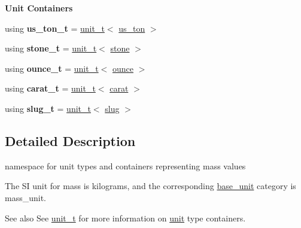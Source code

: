 \begin{Indent}{\bf Unit Containers}
\begin{DoxyCompactItemize}
\item 
\hypertarget{namespaceunits_1_1mass_ad6706fd9cdb7815f29864f4eb13077b9}{}using {\bfseries us\+\_\+ton\+\_\+t} = \hyperlink{classunits_1_1unit__t}{unit\+\_\+t}$<$ \hyperlink{structunits_1_1unit}{us\+\_\+ton} $>$\label{namespaceunits_1_1mass_ad6706fd9cdb7815f29864f4eb13077b9}

\item 
\hypertarget{namespaceunits_1_1mass_a05789560eed7c088be456c8c7b602bf2}{}using {\bfseries stone\+\_\+t} = \hyperlink{classunits_1_1unit__t}{unit\+\_\+t}$<$ \hyperlink{structunits_1_1unit}{stone} $>$\label{namespaceunits_1_1mass_a05789560eed7c088be456c8c7b602bf2}

\item 
\hypertarget{namespaceunits_1_1mass_af2598d3fbe05608d261d20021010ee7c}{}using {\bfseries ounce\+\_\+t} = \hyperlink{classunits_1_1unit__t}{unit\+\_\+t}$<$ \hyperlink{structunits_1_1unit}{ounce} $>$\label{namespaceunits_1_1mass_af2598d3fbe05608d261d20021010ee7c}

\item 
\hypertarget{namespaceunits_1_1mass_a7f8beac1677ae47814b7bc8ad04c6348}{}using {\bfseries carat\+\_\+t} = \hyperlink{classunits_1_1unit__t}{unit\+\_\+t}$<$ \hyperlink{structunits_1_1unit}{carat} $>$\label{namespaceunits_1_1mass_a7f8beac1677ae47814b7bc8ad04c6348}

\item 
\hypertarget{namespaceunits_1_1mass_ad37d20a3e66b4fca35ba9dba16d9cebb}{}using {\bfseries slug\+\_\+t} = \hyperlink{classunits_1_1unit__t}{unit\+\_\+t}$<$ \hyperlink{structunits_1_1unit}{slug} $>$\label{namespaceunits_1_1mass_ad37d20a3e66b4fca35ba9dba16d9cebb}

\end{DoxyCompactItemize}
\end{Indent}


\subsection{Detailed Description}
namespace for unit types and containers representing mass values 

The S\+I unit for mass is {\ttfamily kilograms}, and the corresponding {\ttfamily \hyperlink{structunits_1_1base__unit}{base\+\_\+unit}} category is {\ttfamily mass\+\_\+unit}. \begin{DoxySeeAlso}{See also}
See \hyperlink{classunits_1_1unit__t}{unit\+\_\+t} for more information on \hyperlink{structunits_1_1unit}{unit} type containers. 
\end{DoxySeeAlso}
